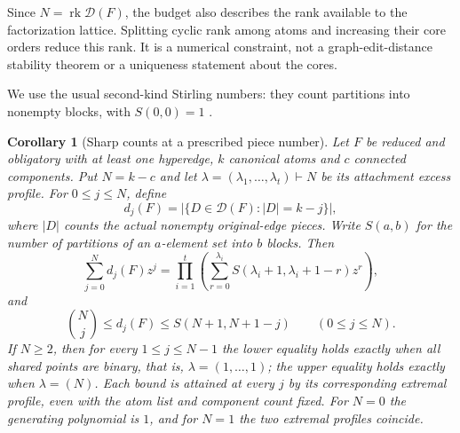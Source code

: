 \documentclass[a4paper,11pt,reqno]{amsart}
\theoremstyle{plain}
\newtheorem{corollary}[theorem]{Corollary}
\theoremstyle{definition}
\theoremstyle{remark}
\begin{document}
Since $N=\operatorname{rk}\mathcal D(F)$, the budget also describes the rank
available to the factorization lattice.  Splitting cyclic rank among atoms
and increasing their core orders reduce this rank.  It is a numerical
constraint, not a graph-edit-distance stability theorem or a uniqueness
statement about the cores.

We use the usual second-kind Stirling numbers: they count partitions into
nonempty blocks, with $S(0,0)=1$ \citep[Section~5.1]{comtet1974}.

\begin{corollary}[Sharp counts at a prescribed piece number]
\label{corollary-sharp-piece-counts}
Let $F$ be reduced and obligatory with at least one hyperedge, $k$ canonical
atoms and $c$ connected components.  Put $N=k-c$ and let
$\lambda=(\lambda_1,\ldots,\lambda_t)\vdash N$ be its attachment excess
profile.  For $0\le j\le N$, define
\[
 d_j(F)=|\{D\in\mathcal D(F):|D|=k-j\}|,
\]
where $|D|$ counts the actual nonempty original-edge pieces.  Write $S(a,b)$
for the number of partitions of an $a$-element set into $b$ blocks.  Then
\[
 \sum_{j=0}^{N}d_j(F)z^j
 =\prod_{i=1}^{t}
   \left(\sum_{r=0}^{\lambda_i}
     S(\lambda_i+1,\lambda_i+1-r)z^r\right),
\]
and
\[
 \binom Nj\le d_j(F)\le S(N+1,N+1-j)
 \qquad(0\le j\le N).
\]
If $N\ge2$, then for every $1\le j\le N-1$ the lower equality holds exactly
when all shared points are binary, that is, $\lambda=(1,\ldots,1)$; the
upper equality holds exactly when $\lambda=(N)$.  Each bound is attained
at every $j$ by its corresponding extremal profile, even with the atom list
and component count fixed.  For $N=0$ the generating polynomial is $1$, and for $N=1$ the
two extremal profiles coincide.
\end{corollary}
\end{document}
